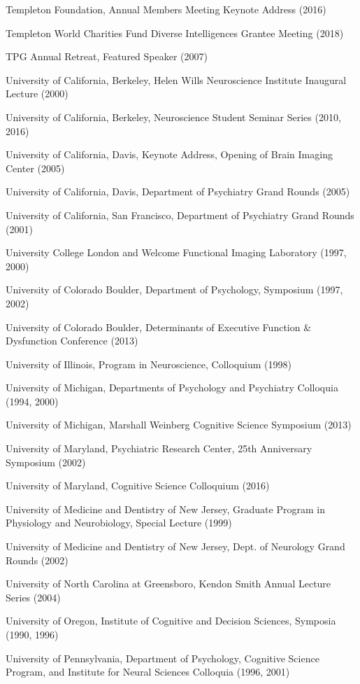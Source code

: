 \documentclass[10 pt]{article}
\begin{document}
Templeton Foundation, Annual Members Meeting Keynote Address (2016)

Templeton World Charities Fund Diverse Intelligences Grantee Meeting (2018)

TPG Annual Retreat, Featured Speaker (2007)

University of California, Berkeley, Helen Wills Neuroscience Institute Inaugural Lecture (2000)

University of California, Berkeley, Neuroscience Student Seminar Series (2010, 2016)

University of California, Davis, Keynote Address, Opening of Brain Imaging Center (2005)

University of California, Davis, Department of Psychiatry Grand Rounds (2005)

University of California, San Francisco, Department of Psychiatry Grand Rounds (2001)

University College London and Welcome Functional Imaging Laboratory (1997, 2000)

University of Colorado Boulder, Department of Psychology, Symposium (1997, 2002)

University of Colorado Boulder, Determinants of Executive Function \& Dysfunction Conference (2013)

University of Illinois, Program in Neuroscience, Colloquium (1998)

University of Michigan, Departments of Psychology and Psychiatry Colloquia (1994, 2000)

University of Michigan, Marshall Weinberg Cognitive Science Symposium (2013)

University of Maryland, Psychiatric Research Center, 25th Anniversary Symposium (2002)

University of Maryland, Cognitive Science Colloquium (2016)

University of Medicine and Dentistry of New Jersey, Graduate Program in Physiology and Neurobiology, Special Lecture (1999)

University of Medicine and Dentistry of New Jersey, Dept. of Neurology Grand Rounds (2002)

University of North Carolina at Greensboro, Kendon Smith Annual Lecture Series (2004)

University of Oregon, Institute of Cognitive and Decision Sciences, Symposia (1990, 1996)

University of Pennsylvania, Department of Psychology, Cognitive Science Program, and Institute for Neural Sciences Colloquia (1996, 2001)
\end{document}
